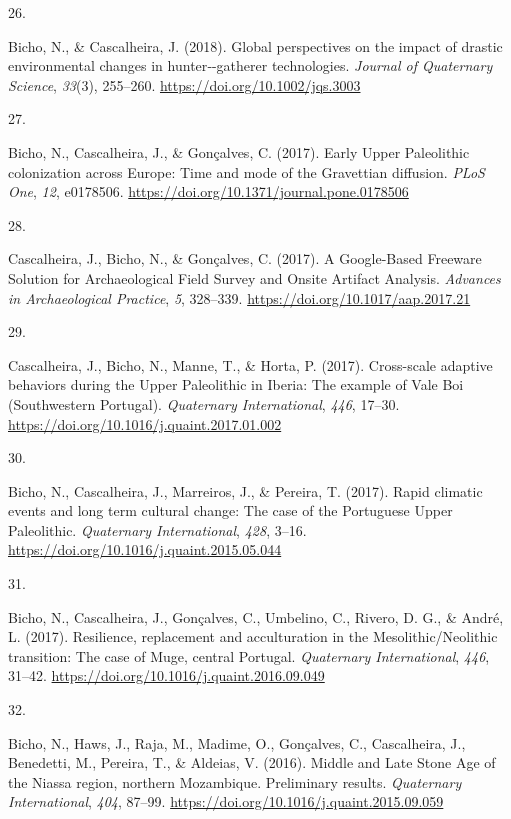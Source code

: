 \documentclass[11pt,a4paper,]{awesome-cv}
\newlength{\cslhangindent}
\newlength{\csllabelwidth}
\newenvironment{CSLReferences}[2] %
 {\begin{list}{}{%
  \setlength{\itemindent}{0pt}
  \setlength{\leftmargin}{0pt}
  \setlength{\parsep}{0pt}
  \ifodd #1
   \setlength{\leftmargin}{\cslhangindent}
   \setlength{\itemindent}{-1\cslhangindent}
  \fi
  \setlength{\itemsep}{#2\baselineskip}}}
 {\end{list}}
\newcommand{\CSLLeftMargin}[1]{\parbox[t]{\csllabelwidth}{\strut#1\strut}}
\newcommand{\CSLRightInline}[1]{\parbox[t]{\linewidth - \csllabelwidth}{\strut#1\strut}}
\begin{document}
\begin{CSLReferences}{0}{0}
\CSLLeftMargin{26. }%
\CSLRightInline{Bicho, N., \& Cascalheira, J. (2018). Global
perspectives on the impact of drastic environmental changes in
hunter‐-gatherer technologies. \emph{Journal of Quaternary Science},
\emph{33}(3), 255--260. \url{https://doi.org/10.1002/jqs.3003}}

\CSLLeftMargin{27. }%
\CSLRightInline{Bicho, N., Cascalheira, J., \& Gonçalves, C. (2017).
Early Upper Paleolithic colonization across Europe: Time and mode of the
Gravettian diffusion. \emph{PLoS One}, \emph{12}, e0178506.
\url{https://doi.org/10.1371/journal.pone.0178506}}

\CSLLeftMargin{28. }%
\CSLRightInline{Cascalheira, J., Bicho, N., \& Gonçalves, C. (2017). A
Google-Based Freeware Solution for Archaeological Field Survey and
Onsite Artifact Analysis. \emph{Advances in Archaeological Practice},
\emph{5}, 328--339. \url{https://doi.org/10.1017/aap.2017.21}}

\CSLLeftMargin{29. }%
\CSLRightInline{Cascalheira, J., Bicho, N., Manne, T., \& Horta, P.
(2017). Cross-scale adaptive behaviors during the Upper Paleolithic in
Iberia: The example of Vale Boi (Southwestern Portugal).
\emph{Quaternary International}, \emph{446}, 17--30.
\url{https://doi.org/10.1016/j.quaint.2017.01.002}}

\CSLLeftMargin{30. }%
\CSLRightInline{Bicho, N., Cascalheira, J., Marreiros, J., \& Pereira,
T. (2017). Rapid climatic events and long term cultural change: The case
of the Portuguese Upper Paleolithic. \emph{Quaternary International},
\emph{428}, 3--16. \url{https://doi.org/10.1016/j.quaint.2015.05.044}}

\CSLLeftMargin{31. }%
\CSLRightInline{Bicho, N., Cascalheira, J., Gonçalves, C., Umbelino, C.,
Rivero, D. G., \& André, L. (2017). Resilience, replacement and
acculturation in the Mesolithic/Neolithic transition: The case of Muge,
central Portugal. \emph{Quaternary International}, \emph{446}, 31--42.
\url{https://doi.org/10.1016/j.quaint.2016.09.049}}

\CSLLeftMargin{32. }%
\CSLRightInline{Bicho, N., Haws, J., Raja, M., Madime, O., Gonçalves,
C., Cascalheira, J., Benedetti, M., Pereira, T., \& Aldeias, V. (2016).
Middle and Late Stone Age of the Niassa region, northern Mozambique.
Preliminary results. \emph{Quaternary International}, \emph{404},
87--99. \url{https://doi.org/10.1016/j.quaint.2015.09.059}}


\end{CSLReferences}
\end{document}
